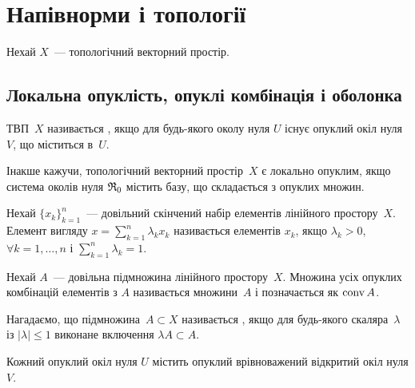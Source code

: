 \chapter{Напівнорми і топології}

Нехай $X$~--- топологічний векторний простір.

\section{Локальна опуклість, опуклі комбінація і оболонка}

\begin{definition}
    ТВП~$X$ називається , якщо для будь-якого околу нуля $U$ існує опуклий окіл нуля $V$, що міститься в~$U$.
\end{definition}

\begin{remark}
    Інакше кажучи, топологічний векторний простір~$X$ є локально опуклим, якщо система околів нуля $\frak R_0$ містить базу, що складається з опуклих множин.
\end{remark}

\begin{definition}
    Нехай $\{x_k\}_{k = 1}^n$~--- довільний скінчений набір елементів лінійного простору~$X$. Елемент вигляду $x = \sum_{k = 1}^n \lambda_k x_k$ називається  елементів $x_k$, якщо $\lambda_k > 0$, $\forall k = 1, \dots, n$ і $\sum_{k = 1}^n \lambda_k = 1$.
\end{definition}

\begin{definition}
    Нехай $A$~--- довільна підмножина лінійного простору~$X$. Множина усіх опуклих комбінацій елементів з $A$ називається  множини~$A$ і позначається як $\convex A$.
\end{definition}

\begin{definition}
    Нагадаємо, що підмножина~$A \subset X$ називається , якщо для будь-якого скаляра~$\lambda$ із $|\lambda| \le 1$ виконане включення $\lambda A \subset A$.
\end{definition}

\begin{theorem}
    Кожний опуклий окіл нуля $U$ містить опуклий врівноважений відкритий окіл нуля $V$.
\end{theorem}

